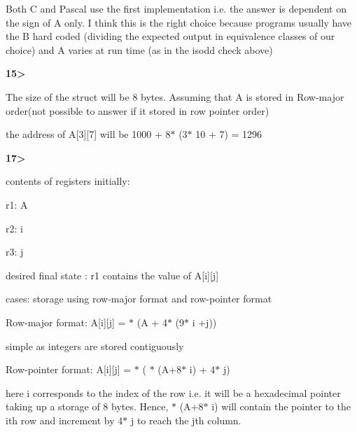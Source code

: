 \documentclass[12pt]{article}
\renewcommand{\_}{\kern-1.5pt\textunderscore\kern-1.5pt}
\begin{document}
\vspace{\baselineskip}
Both C and Pascal use the first implementation i.e. the answer is dependent on the sign of A only. I think this is the right choice because programs usually have the B hard coded (dividing the expected output in equivalence classes of our choice) and A varies at run time (as in the is\_odd check above) \par


\vspace{\baselineskip}
\textbf{15>}\par

The size of the struct will be 8 bytes. Assuming that A is stored in Row-major order(not possible to answer if it stored in row pointer order)\par

the address of A[3][7] will be 1000 + 8$\ast$ (3$\ast$ 10 + 7) = 1296\par


\vspace{\baselineskip}

\vspace{\baselineskip}
\textbf{17>}\par

contents of registers initially:\par

r1: A\par

r2: i\par

r3: j\par


\vspace{\baselineskip}
desired final state : r1 contains the value of A[i][j]\par

cases: storage using row-major format and row-pointer format\par


\vspace{\baselineskip}
Row-major format: A[i][j] = $\ast$ (A + 4$\ast$ (9$\ast$ i +j))\par

simple as integers are stored contiguously\par


\vspace{\baselineskip}
Row-pointer format: A[i][j] = $\ast$ ( $\ast$ (A+8$\ast$ i) + 4$\ast$ j)\par

here i corresponds to the index of the row i.e. it will be a hexadecimal pointer taking up a storage of 8 bytes. Hence, $\ast$ (A+8$\ast$ i) will contain the pointer to the ith row and increment by 4$\ast$ j to reach the jth column.\par
\end{document}
